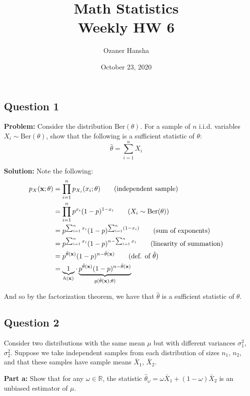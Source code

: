 \documentclass{article}
\renewcommand{\vec}[1]{\mathbf{#1}}
\begin{document}
\title{Math Statistics\\ Weekly HW 6}
\author{Ozaner Hansha}
\date{October 23, 2020}
\maketitle

\subsection*{Question 1}
\noindent\textbf{Problem:} Consider the distribution $\text{Ber}(\theta)$. For a sample of $n$ i.i.d. variables $X_i\sim\text{Ber}(\theta)$, show that the following is a sufficient statistic of $\theta$:
$$\hat\theta=\sum_{i=1}^nX_i$$
\smallskip

\noindent\textbf{Solution:} Note the following:
\begin{align*}
    p_X(\vec x;\theta)&=\prod_{i=1}^np_{X_i}(x_i;\theta)\tag{independent sample}\\
    &=\prod_{i=1}^np^{x_i}(1-p)^{1-x_i}\tag{$X_i\sim\text{Ber}(\theta)$}\\
    &=p^{\sum_{i=1}^nx_i}(1-p)^{\sum_{i=1}^n(1-x_i)}\tag{sum of exponents}\\
    &=p^{\sum_{i=1}^nx_i}(1-p)^{n-\sum_{i=1}^nx_i}\tag{linearity of summation}\\
    &=p^{\hat\theta(\vec x)}(1-p)^{n-\hat\theta(\vec x)}\tag{def. of $\hat\theta$}\\
    &=\underbrace{1}_{h(\vec x)}\cdot\underbrace{p^{\hat\theta(\vec x)}(1-p)^{n-\hat\theta(\vec x)}}_{g(\hat\theta(\vec x);\theta)}
\end{align*}

And so by the factorization theorem, we have that $\hat\theta$ is a sufficient statistic of $\theta$.
\bigskip

\subsection*{Question 2}
Consider two distributions with the same mean $\mu$ but with different variances $\sigma^2_1$, $\sigma^2_2$. Suppose we take independent samples from each distribution of sizes $n_1$, $n_2$, and that these samples have sample means $\bar X_1$, $\bar X_2$.
\bigskip

\noindent\textbf{Part a:} Show that for any $\omega\in\mathbb R$, the statistic $\hat\theta_\omega=\omega\bar X_1+(1-\omega)\bar X_2$ is an unbiased estimator of $\mu$.
\bigskip
\end{document}
